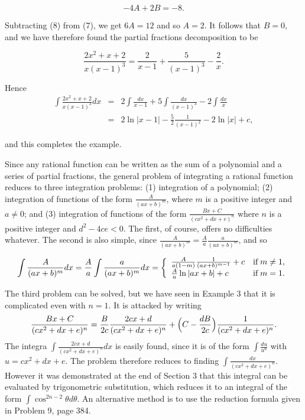 \begin{example}
\begin{equation}
-4A + 2B = - 8. 
\label{eq7.4.8}
\end{equation}

\noindent Subtracting (8) from (7), we get $6A = 12$ and so $A = 2$. It follows that $B = 0$, and we have therefore found the partial fractions decomposition to be

$$
\frac{2x^2 + x + 2}{x(x - 1)^3} = \frac{2}{x - 1} + \frac{5}{(x - 1)^3} - \frac{2}{x}. 
$$

\noindent Hence
\begin{eqnarray*}
\int \frac{2x^2 + x + 2}{x(x -1)^3} dx 
&=& 2\int \frac{dx}{x - 1} + 5 \int \frac{dx}{(x - 1)^3} - 2 \int \frac{dx}{x}\\
&=& 2 \ln | x - 1| - \frac{5}{2} \frac{1}{(x - 1)^2} - 2 \ln |x| + c, 
\end{eqnarray*}

\noindent and this completes the example. 
\end{example}

Since any rational function can be written as the sum of a polynomial and a series of partial fractions, the general problem of integrating a rational function reduces to three integration problems: (1) integration of a polynomial; (2) integration of functions of the form $\frac{A}{(ax + b)^m}$, where $m$ is a positive integer and $a \neq 0$; and (3) integration of functions of the form $\frac{Bx + C}{(cx^2 + dx + e)^n}$ where $n$ is a positive integer and $d^2 - 4ce < 0$. The first, of course, offers no difficulties whatever. The second is also simple, since $\frac{A}{(ax + b)^m} = \frac{A}{a} \frac{a}
{(ax + b)^m}$, and so   

$$
\int \frac{A}{(ax + b)^m} dx = \frac{A}{a} \int \frac{a}{(ax + b)^m}dx\\
= \left \{ 
               \begin{array}{ll}
\frac{A}{a(1 - m)} \frac{1}{(ax + b)^{m-1}} + c   &\mbox{if}\; m \neq 1,\\
\frac{A}{a} \ln | ax + b | + c                               &\mbox{if}\; m = 1.
               \end{array}
\right.
$$

\noindent The third problem can be solved, but we have seen in Example 3 that it is complicated even with $n = 1$. It is attacked by writing
$$
\frac{Bx + C} {(cx^2 + dx + e)^n} = \frac{B}{2c} \frac{2cx + d}{(cx^2 + dx + e)^n} + \Bigl(C - \frac{dB}{2c} \Bigr) \frac{1}{ (cx^2 + dx +
e)^n}. 
$$
\noindent The integra $\int \frac{2cx + d}{(cx^2 + dx + e)^n} dx$ is easily found, since it is of the form $\int \frac{du}{u^n}$ with $u = cx^2 + dx + e$.
The problem therefore reduces to finding $\int \frac{dx}{(cx^2 + dx + e)^n}$. However it was demonstrated at the end of Section 3 that this integral can be evaluated by trigonometric substitution, which reduces it to an integral of the form $\int \cos^{2n-2} \theta d\theta$. An alternative method is to use the reduction formula given in Problem 9, page 384.

